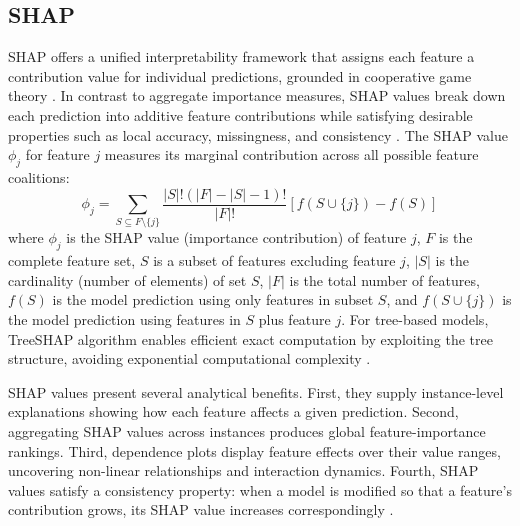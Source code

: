 \documentclass[oneside,doublespacing,flushright]{lsuthesis}
\begin{document}
\subsection{SHAP}
SHAP offers a unified interpretability framework that assigns each feature a contribution value for individual predictions, grounded in cooperative game theory \citep{Lundberg2017}. In contrast to aggregate importance measures, 
SHAP values break down each prediction into additive feature contributions while satisfying desirable properties such as local accuracy, missingness, and consistency \citep{yu_explainable_2025}. 
The SHAP value $\phi_j$ for feature $j$ measures its marginal contribution across all possible feature coalitions:
\begin{equation}
\phi_j = \sum_{S \subseteq F \setminus \{j\}} \frac{|S|!(|F|-|S|-1)!}{|F|!} \left[f(S \cup \{j\}) - f(S)\right]
\end{equation}
where $\phi_j$ is the SHAP value (importance contribution) of feature $j$, $F$ is the complete feature set, $S$ is a subset of features excluding feature $j$, $|S|$ is the cardinality (number of elements) of set $S$, $|F|$ is the total number of features, $f(S)$ is the model prediction using only features in subset $S$, and $f(S \cup \{j\})$ is the model prediction using features in $S$ plus feature $j$. For tree-based models, TreeSHAP algorithm enables efficient exact computation by exploiting the tree structure, avoiding exponential computational complexity \citep{Lundberg2017}.

SHAP values present several analytical benefits. First, they supply instance-level explanations showing how each feature affects a given prediction. Second, aggregating SHAP values across instances produces global feature-importance rankings. Third, dependence plots display feature effects over their value ranges, uncovering non-linear relationships and interaction dynamics. Fourth, SHAP values satisfy a consistency property: when a model is modified so that a feature's contribution grows, its SHAP value increases correspondingly \citep{yu_explainable_2025}.
\end{document}
